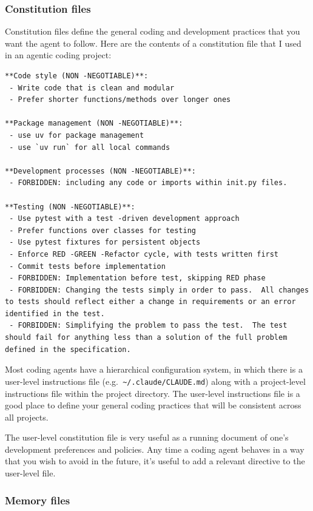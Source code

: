 \subsubsection{Constitution files}

Constitution files define the general coding and development practices that you want the agent to follow.  Here are the contents of a constitution file that I used in an agentic coding project:

\begin{lstlisting}
**Code style (NON -NEGOTIABLE)**:
 - Write code that is clean and modular
 - Prefer shorter functions/methods over longer ones

**Package management (NON -NEGOTIABLE)**:
 - use uv for package management
 - use `uv run` for all local commands

**Development processes (NON -NEGOTIABLE)**:
 - FORBIDDEN: including any code or imports within init.py files.

**Testing (NON -NEGOTIABLE)**:
 - Use pytest with a test -driven development approach
 - Prefer functions over classes for testing
 - Use pytest fixtures for persistent objects
 - Enforce RED -GREEN -Refactor cycle, with tests written first
 - Commit tests before implementation
 - FORBIDDEN: Implementation before test, skipping RED phase
 - FORBIDDEN: Changing the tests simply in order to pass.  All changes to tests should reflect either a change in requirements or an error identified in the test.
 - FORBIDDEN: Simplifying the problem to pass the test.  The test should fail for anything less than a solution of the full problem defined in the specification.
\end{lstlisting}

Most coding agents have a hierarchical configuration system, in which there is a user-level instructions file (e.g.\texttt{ {\textasciitilde}/.claude/CLAUDE.md}) along with a project-level instructions file within the project directory.  The user-level instructions file is a good place to define your general coding practices that will be consistent across all projects.

The user-level constitution file is very useful as a running document of one's development preferences and policies. Any time a coding agent behaves in a way that you wish to avoid in the future, it's useful to add a relevant directive to the user-level file.

\subsubsection{Memory files}

